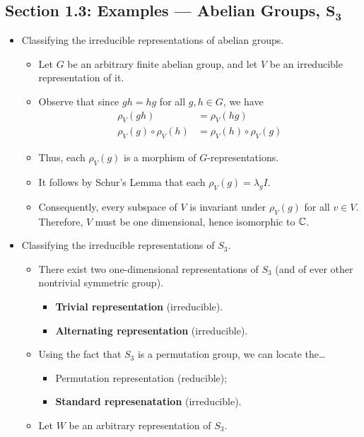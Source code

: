 \documentclass[../notes.tex]{subfiles}
\begin{document}
\subsection*{Section 1.3: Examples --- Abelian Groups, $\bm{S_3}$}
\begin{itemize}
    \item Classifying the irreducible representations of abelian groups.
    \begin{itemize}
        \item Let $G$ be an arbitrary finite abelian group, and let $V$ be an irreducible representation of it.
        \item Observe that since $gh=hg$ for all $g,h\in G$, we have
        \begin{align*}
            \rho_V(gh) &= \rho_V(hg)\\
            \rho_V(g)\circ\rho_V(h) &= \rho_V(h)\circ\rho_V(g)
        \end{align*}
        \item Thus, each $\rho_V(g)$ is a morphism of $G$-representations.
        \item It follows by Schur's Lemma that each $\rho_V(g)=\lambda_gI$.
        \item Consequently, every subspace of $V$ is invariant under $\rho_V(g)$ for all $v\in V$. Therefore, $V$ must be one dimensional, hence isomorphic to $\mathbb{C}$.
    \end{itemize}
    \item Classifying the irreducible representations of $S_3$.
    \begin{itemize}
        \item There exist two one-dimensional representations of $S_3$ (and of ever other nontrivial symmetric group).
        \begin{itemize}
            \item \textbf{Trivial representation} (irreducible).
            \item \textbf{Alternating representation} (irreducible).
        \end{itemize}
        \item Using the fact that $S_3$ is a permutation group, we can locate the\dots
        \begin{itemize}
            \item Permutation representation (reducible);
            \item \textbf{Standard represenatation} (irreducible).
        \end{itemize}
        \item Let $W$ be an arbitrary representation of $S_3$.

\end{itemize}
\end{itemize}
\end{document}
